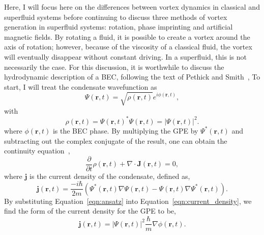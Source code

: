 Here, I will focus here on the differences between vortex dynamics in classical and superfluid systems before continuing to discuss three methods of vortex generation in superfluid systems: rotation, phase imprinting and artificial magnetic fields.
By rotating a fluid, it is possible to create a vortex around the axis of rotation; however, because of the viscosity of a classical fluid, the vortex will eventually disappear without constant driving.
In a superfluid, this is not necessarily the case.
For this discussion, it is worthwhile to discuss the hydrodynamic description of a BEC, following the text of Pethick and Smith~\cite{pethick2002},
To start, I will treat the condensate wavefunction as
\begin{equation}
\Psi(\mathbf{r},t) = \sqrt{\rho(\mathbf{r},t)}e^{i\phi(\mathbf{r},t)},
\label{eqn:ansatz}
\end{equation}
\noindent with
\begin{equation}
\rho(\mathbf{r},t)=\Psi(\mathbf{r},t)^*\Psi(\mathbf{r},t) = |\Psi(\mathbf{r},t)|^2.
\end{equation}
\noindent where $\phi(\mathbf{r},t)$ is the BEC phase.
By multiplying the GPE by $\Psi^*(\mathbf{r},t)$ and subtracting out the complex conjugate of the result, one can obtain the continuity equation~\cite{pethick2002},
\begin{equation}
\frac{\partial}{\partial t}\rho(\mathbf{r},t)+\nabla\cdot\mathbf{J}(\mathbf{r},t) = 0,
\end{equation}
\noindent where $\mathbf{j}$ is the current density of the condensate, defined as,
\begin{equation}
\mathbf{j}(\mathbf{r},t) = \frac{-i\hbar}{2m}\left( \Psi^*(\mathbf{r},t)\nabla\Psi(\mathbf{r},t)- \Psi(\mathbf{r},t)\nabla\Psi^*(\mathbf{r},t)\right).
\label{eqn:current_density}
\end{equation}
By substituting Equation~\eqref{eqn:ansatz} into Equation~\eqref{eqn:current_density}, we find the form of the current density for the GPE to be,
\begin{equation}
\mathbf{j}(\mathbf{r},t) = |\Psi(\mathbf{r},t)|^2\frac{\hbar}{m}\nabla\phi(\mathbf{r},t).
\end{equation}

